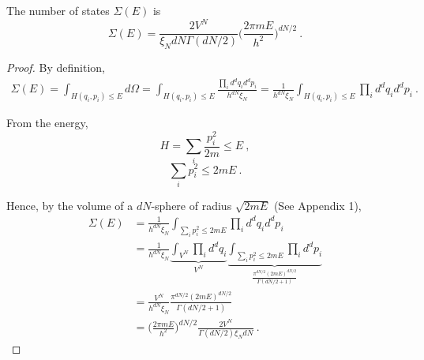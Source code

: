     The number of states $\Sigma(E)$ is 
    \begin{equation*}
        \Sigma(E) = \frac{2V^{N}}{\xi_N d N \Gamma(dN/2)} \Big ( \frac{2 \pi m E}{h^2}\Big)^{dN/2} ~.
    \end{equation*}
    \begin{proof}
        By definition, 
        \begin{equation*}
        \begin{aligned}
            \Sigma (E) = \int_{H (q_i, p_i) \leq E} d\Omega = \int_{H (q_i, p_i) \leq E} \frac{\prod_i d^d q_i d^d p_i}{h^{dN} \xi_N} = \frac{1}{h^{dN} \xi_N} \int_{H (q_i, p_i) \leq E} \prod_i d^d q_i d^d p_i ~.
        \end{aligned}
        \end{equation*}

        From the energy,
        \begin{equation*}
            H = \sum_i \frac{p^2_i}{2m} \leq E ~,
        \end{equation*}
        \begin{equation*}
            \sum_i p^2_i \leq 2mE ~.
        \end{equation*}

        Hence, by the volume of a $dN$-sphere of radius $\sqrt{2mE}$ (See Appendix 1),
        \begin{equation*}
        \begin{aligned}
            \Sigma (E) & = \frac{1}{h^{dN} \xi_N} \int_{\sum_i p^2_i \leq 2mE} \prod_i d^d q_i d^d p_i \\ & = \frac{1}{h^{dN} \xi_N} \underbrace{\int_{V^N} \prod_i d^d q_i}_{V^N} \underbrace{\int_{\sum_i p^2_i \leq 2mE} \prod_i d^d p_i}_{\frac{\pi^{dN/2} (2mE)^{dN/2}}{\Gamma (dN/2 + 1)}} \\ & = \frac{V^N}{h^{dN} \xi_N} \frac{\pi^{dN/2} (2mE)^{dN/2}}{\Gamma (dN/2 + 1)} \\ & = \Big (\frac{2 \pi m E}{h^2} \Big)^{dN/2} \frac{2 V^N}{\Gamma (dN/2)\xi_N d N} ~.
        \end{aligned}
        \end{equation*}
    \end{proof}

